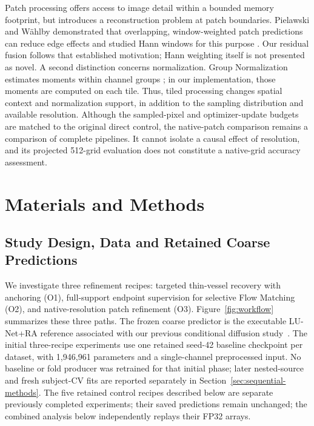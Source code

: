 \documentclass[jimaging,article,submit,pdftex,moreauthors]{Definitions/mdpi}
\begin{document}
Patch processing offers access to image detail within a bounded memory footprint,
but introduces a reconstruction problem at patch boundaries. Pielawski and
W\"ahlby demonstrated that overlapping, window-weighted patch predictions can
reduce edge effects and studied Hann windows for this purpose
\cite{Pielawski2020}. Our residual fusion follows that established motivation;
Hann weighting itself is not presented as novel. A second distinction concerns
normalization. Group Normalization estimates moments within channel groups
\cite{Wu2018GroupNorm}; in our implementation, those moments are computed on each
tile. Thus, tiled processing changes spatial context and normalization support,
in addition to the sampling distribution and available resolution. Although the
sampled-pixel and optimizer-update budgets are matched to the original direct
control, the native-patch comparison remains a comparison of complete pipelines.
It cannot isolate a causal effect of resolution, and its projected 512-grid
evaluation does not constitute a native-grid accuracy assessment.

\section{Materials and Methods}\label{sec:methods}

\subsection{Study Design, Data and Retained Coarse Predictions}
We investigate three refinement recipes: targeted thin-vessel recovery with
anchoring (O1), full-support endpoint supervision for selective Flow Matching
(O2), and native-resolution patch refinement (O3). Figure~\ref{fig:workflow}
summarizes these three paths. The frozen coarse predictor
is the executable LU-Net+RA reference associated with our previous conditional
diffusion study~\cite{Bayanian2026}. The initial three-recipe experiments use one retained
seed-42 baseline checkpoint per dataset, with 1,946,961 parameters and a
single-channel preprocessed input. No baseline or fold producer was retrained
for that initial phase; later nested-source and fresh subject-CV fits are
reported separately in Section~\ref{sec:sequential-methods}. The five retained control recipes described below are
separate previously completed experiments; their saved predictions remain unchanged; the combined analysis below independently replays their FP32 arrays.
\end{document}
